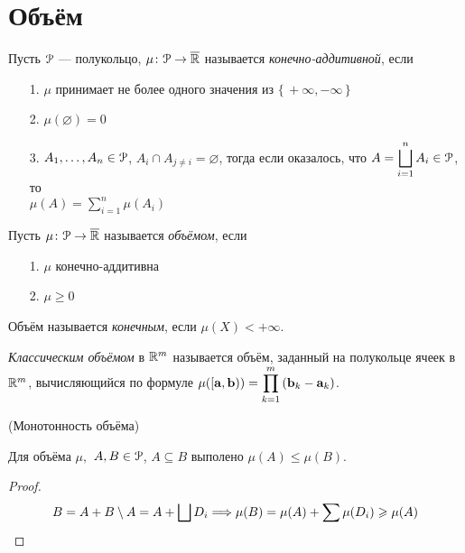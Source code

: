 \section{Объём}

\begin{definition}
    Пусть $\mathcal{P}$ --- полукольцо, $\mu \colon \mathcal{P} \to \overline{\mathbb{R}}$ называется
    \textit{конечно-аддитивной}, если
    \begin{itemize}
        \item[1.] $\mu$ принимает не более одного значения из $\{\,+\infty, -\infty\,\}$
        \item[2.] $\mu(\varnothing) = 0$
        \item[3.] $A_1, \ldots, A_n \in \mathcal{P}$, $A_i \cap A_{j \neq i} = \varnothing$,
        тогда если оказалось, что $\displaystyle A = \bigsqcup_{i = 1}^{n}{A_i} \in \mathcal{P}$,
        то \\ $\displaystyle \mu(A) = \sum_{i = 1}^{n}{\mu(A_i)}$
    \end{itemize}
\end{definition}

\begin{definition}
    Пусть $\mu \colon \mathcal{P} \to \overline{\mathbb{R}}$ называется \textit{объёмом}, если
    \begin{itemize}
        \item[1.] $\mu$ конечно-аддитивна
        \item[2.] $\mu \geqslant 0$
    \end{itemize}
\end{definition}

\begin{definition}
    Объём называется \textit{конечным}, если $\mu(X) < +\infty$.
\end{definition}

\begin{definition}
    \textit{Классическим объёмом} в $\mathbb{R}^m$ называется объём, заданный на
    полукольце ячеек в $\mathbb{R}^m$, вычисляющийся по формуле
    $\displaystyle \mu([\mathbf{a}, \mathbf{b})) = \prod_{k = 1}^{m}{(\mathbf{b}_k - \mathbf{a}_k)}$.
\end{definition}

\begin{lemma}(Монотонность объёма)

    Для объёма $\mu,$ $A, B \in \mathcal{P}$, $A \subseteq B$ выполено $\mu(A) \leqslant \mu(B)$.
\end{lemma}
\begin{proof}
\[
    B = A + B \setminus A = A + \bigsqcup{D_i} \Longrightarrow \mu(B) = \mu(A) + \sum{\mu(D_i)}
    \geqslant \mu(A)
\]
\end{proof}

